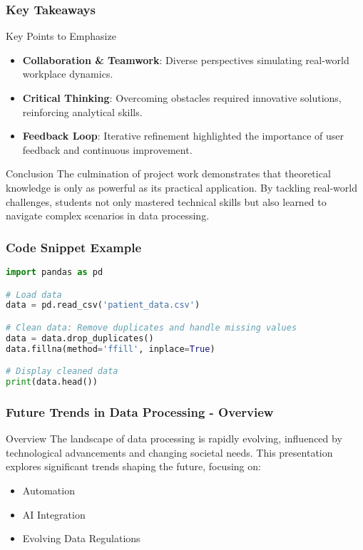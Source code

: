 \documentclass{beamer}
\begin{document}
\begin{frame}[fragile]
    \frametitle{Key Takeaways}
    \begin{block}{Key Points to Emphasize}
        \begin{itemize}
            \item \textbf{Collaboration \& Teamwork}: Diverse perspectives simulating real-world workplace dynamics.
            \item \textbf{Critical Thinking}: Overcoming obstacles required innovative solutions, reinforcing analytical skills.
            \item \textbf{Feedback Loop}: Iterative refinement highlighted the importance of user feedback and continuous improvement.
        \end{itemize}
    \end{block}
    
    \begin{block}{Conclusion}
        The culmination of project work demonstrates that theoretical knowledge is only as powerful as its practical application. By tackling real-world challenges, students not only mastered technical skills but also learned to navigate complex scenarios in data processing.
    \end{block}
\end{frame}

\begin{frame}[fragile]
    \frametitle{Code Snippet Example}
    \begin{lstlisting}[language=Python]
import pandas as pd

# Load data
data = pd.read_csv('patient_data.csv')

# Clean data: Remove duplicates and handle missing values
data = data.drop_duplicates()
data.fillna(method='ffill', inplace=True)

# Display cleaned data
print(data.head())
    \end{lstlisting}
\end{frame}

\begin{frame}[fragile]
    \frametitle{Future Trends in Data Processing - Overview}
    \begin{block}{Overview}
        The landscape of data processing is rapidly evolving, influenced by technological advancements and changing societal needs. This presentation explores significant trends shaping the future, focusing on:
    \end{block}
    \begin{itemize}
        \item Automation
        \item AI Integration
        \item Evolving Data Regulations
    \end{itemize}
\end{frame}
\end{document}

